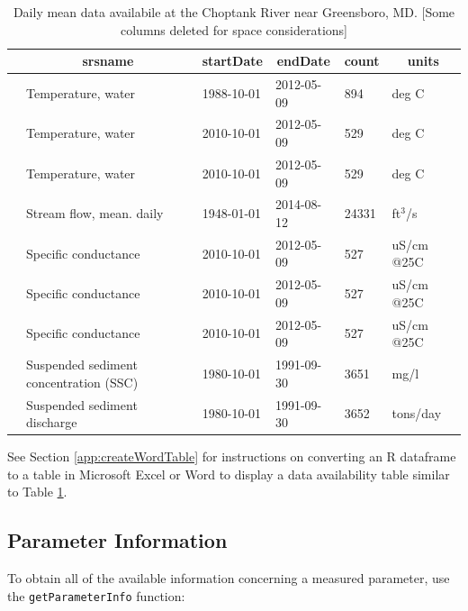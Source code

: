 \documentclass[a4paper,11pt]{article}\usepackage[]{graphicx}\usepackage[]{color}
\begin{document}
\begin{table}[ht]
\caption{Daily mean data availabile at the Choptank River near Greensboro, MD. [Some columns deleted for space considerations]} 
\label{tab:gda}
{\footnotesize
\begin{tabular}{rlllll}
  \hline
 & \multicolumn{1}{c}{\textbf{\textsf{srsname}}} & \multicolumn{1}{c}{\textbf{\textsf{startDate}}} & \multicolumn{1}{c}{\textbf{\textsf{endDate}}} & \multicolumn{1}{c}{\textbf{\textsf{count}}} & \multicolumn{1}{c}{\textbf{\textsf{units}}} \\ 
  \hline
 & Temperature, water & 1988-10-01 & 2012-05-09 & 894 & deg C \\ 
  [5pt] & Temperature, water & 2010-10-01 & 2012-05-09 & 529 & deg C \\ 
  [5pt] & Temperature, water & 2010-10-01 & 2012-05-09 & 529 & deg C \\ 
  [5pt] & Stream flow, mean. daily & 1948-01-01 & 2014-08-12 & 24331 & ft$^3$/s \\ 
  [5pt] & Specific conductance & 2010-10-01 & 2012-05-09 & 527 & uS/cm @25C \\ 
  [5pt] & Specific conductance & 2010-10-01 & 2012-05-09 & 527 & uS/cm @25C \\ 
  [5pt] & Specific conductance & 2010-10-01 & 2012-05-09 & 527 & uS/cm @25C \\ 
  [5pt] & Suspended sediment concentration (SSC) & 1980-10-01 & 1991-09-30 & 3651 & mg/l \\ 
  [5pt] & Suspended sediment discharge & 1980-10-01 & 1991-09-30 & 3652 & tons/day \\ 
   \hline
\end{tabular}
}
\end{table}


See Section \ref{app:createWordTable} for instructions on converting an R dataframe to a table in Microsoft Excel or Word to display a data availability table similar to Table \ref{tab:gda}.

\FloatBarrier

\subsection{Parameter Information}
\label{sec:usgsParams}
To obtain all of the available information concerning a measured parameter, use the \texttt{getParameterInfo} function:
\end{document}
